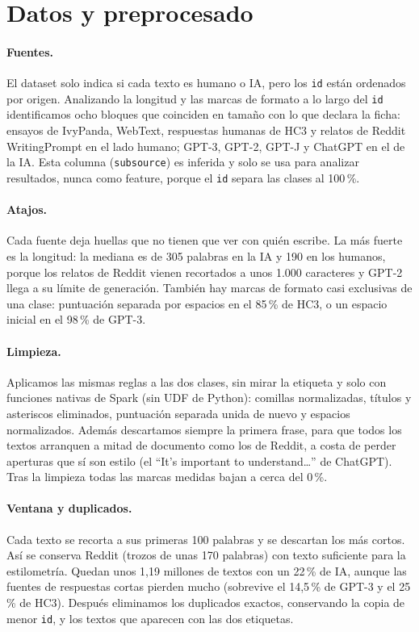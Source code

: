 \documentclass[runningheads]{llncs}
\begin{document}
\section{Datos y preprocesado}

\paragraph{Fuentes.} El dataset solo indica si cada texto es humano o IA, pero los \texttt{id}
están ordenados por origen. Analizando la longitud y las marcas de formato a lo largo del
\texttt{id} identificamos ocho bloques que coinciden en tamaño con lo que declara la ficha:
ensayos de IvyPanda, WebText, respuestas humanas de HC3 y relatos de Reddit
WritingPrompt en el lado humano; GPT-3, GPT-2,
GPT-J y ChatGPT en el de la IA. Esta columna (\texttt{subsource}) es inferida y solo se usa
para analizar resultados, nunca como feature, porque el \texttt{id} separa las clases al 100\,\%.

\paragraph{Atajos.} Cada fuente deja huellas que no tienen que ver con quién escribe. La más
fuerte es la longitud: la mediana es de 305 palabras en la IA y 190 en los humanos, porque
los relatos de Reddit vienen recortados a unos 1.000 caracteres y GPT-2 llega a su límite de
generación. También hay marcas de formato casi exclusivas de una clase: puntuación separada
por espacios en el 85\,\% de HC3, o un espacio inicial en el 98\,\% de GPT-3.

\paragraph{Limpieza.} Aplicamos las mismas reglas a las dos clases, sin mirar la etiqueta y
solo con funciones nativas de Spark (sin UDF de Python): comillas normalizadas, títulos y
asteriscos eliminados, puntuación separada unida de nuevo y espacios normalizados. Además
descartamos siempre la primera frase, para que todos los textos arranquen a mitad de documento
como los de Reddit, a costa de perder aperturas que sí son estilo (el ``It's important to
understand\ldots'' de ChatGPT). Tras la limpieza todas las marcas medidas bajan a cerca del
0\,\%.

\paragraph{Ventana y duplicados.} Cada texto se recorta a sus primeras 100
palabras y se descartan los más cortos. Así se conserva Reddit (trozos de unas 170 palabras)
con texto suficiente para la estilometría. Quedan unos 1,19
millones de textos con un 22\,\% de IA, aunque las fuentes de respuestas cortas pierden mucho
(sobrevive el 14,5\,\% de GPT-3 y el 25\,\% de HC3). Después eliminamos los duplicados exactos,
conservando la copia de menor \texttt{id}, y los textos que aparecen con las dos etiquetas.
\end{document}

